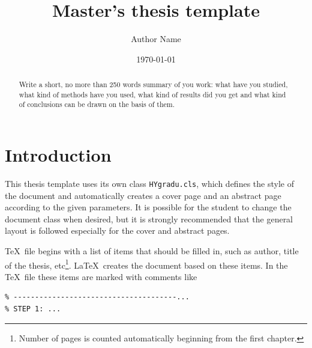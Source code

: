 \documentclass[english,twoside,openright]{HYgradu}
\title{Master's thesis template}
\author{Author Name}
\date{\today}
\begin{document}
\maketitle


\begin{abstract}
  Write a short, no more than 250 words summary of you work: what have
  you studied, what kind of methods have you used, what kind of
  results did you get and what kind of conclusions can be drawn on the
  basis of them.
\end{abstract}

\mytableofcontents
\mynomenclature


\chapter{Introduction}

This thesis template uses its own class \texttt{HYgradu.cls}, which
defines the style of the document and automatically creates a cover
page and an abstract page according to the given parameters. It is
possible for the student to change the document class when desired,
but it is strongly recommended that the general layout is followed
especially for the cover and abstract pages.

\TeX\ file begins with a list of items that should be filled in, such
as author, title of the thesis, etc\footnote{Number of pages is
  counted automatically beginning from the first chapter.}. \LaTeX\
creates the document based on these items. In the \TeX\ file these
items are marked with comments like
\begin{verbatim}
% --------------------------------------...
% STEP 1: ...
\end{verbatim}
\end{document}
